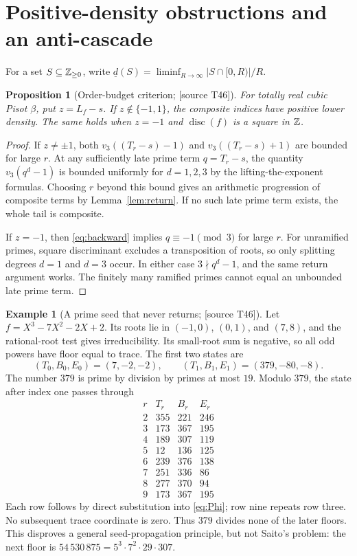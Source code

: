 \documentclass[11pt,a4paper]{article}
\newtheorem{proposition}[theorem]{Proposition}
\theoremstyle{definition}\newtheorem{definition}[theorem]{Definition}
\newtheorem{example}[theorem]{Example}
\theoremstyle{remark}\newtheorem{remark}[theorem]{Remark}
\newcommand{\sourceT}[1]{\textup{[source T#1]}}
\begin{document}
\section{Positive-density obstructions and an anti-cascade}
For a set $S\subseteq\mathbb Z_{\ge0}$, write
$\underline d(S)=\liminf_{R\to\infty}|S\cap[0,R)|/R$.
\begin{proposition}[Order-budget criterion; \sourceT{46}]\label{prop:density}
For totally real cubic Pisot $\beta$, put $z=L_f-s$. If $z\notin\{-1,1\}$, the composite indices have positive lower density. The same holds when $z=-1$ and $\operatorname{disc}(f)$ is a square in $\mathbb Z$.
\end{proposition}
\begin{proof}
If $z\ne\pm1$, both $v_3((T_r-s)-1)$ and $v_3((T_r-s)+1)$ are bounded for large $r$. At any sufficiently late prime term $q=T_r-s$, the quantity $v_3(q^d-1)$ is bounded uniformly for $d=1,2,3$ by the lifting-the-exponent formulas. Choosing $r$ beyond this bound gives an arithmetic progression of composite terms by Lemma~\ref{lem:return}. If no such late prime term exists, the whole tail is composite.

If $z=-1$, then \eqref{eq:backward} implies $q\equiv-1\pmod3$ for large $r$. For unramified primes, square discriminant excludes a transposition of roots, so only splitting degrees $d=1$ and $d=3$ occur. In either case $3\nmid q^d-1$, and the same return argument works. The finitely many ramified primes cannot equal an unbounded late prime term.
\end{proof}

\begin{example}[A prime seed that never returns; \sourceT{46}]\label{ex:379}
Let $f=X^3-7X^2-2X+2$. Its roots lie in $(-1,0)$, $(0,1)$, and $(7,8)$, and the rational-root test gives irreducibility. Its small-root sum is negative, so all odd powers have floor equal to trace. The first two states are
\[
 (T_0,B_0,E_0)=(7,-2,-2),\qquad (T_1,B_1,E_1)=(379,-80,-8).
\]
The number $379$ is prime by division by primes at most $19$. Modulo $379$, the state after index one passes through
\[
\begin{array}{c|rrr}
 r&T_r&B_r&E_r\\\hline
2&355&221&246\\3&173&367&195\\4&189&307&119\\
5&12&136&125\\6&239&376&138\\7&251&336&86\\8&277&370&94\\9&173&367&195
\end{array}
\]
Each row follows by direct substitution into \eqref{eq:Phi}; row nine repeats row three. No subsequent trace coordinate is zero. Thus $379$ divides none of the later floors. This disproves a general seed-propagation principle, but not Saito's problem: the next floor is
$54\,530\,875=5^3\cdot7^2\cdot29\cdot307$.
\end{example}
\end{document}
